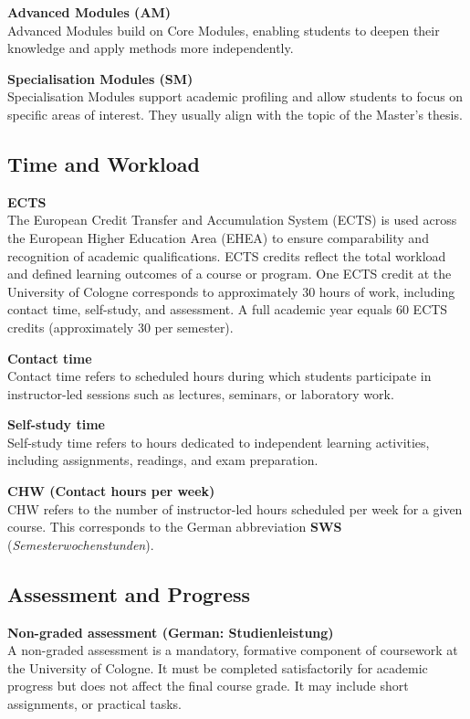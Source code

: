 \documentclass[
  letterpaper,
  10pt,
  openany]{book}
\begin{document}
\textbf{Advanced Modules (AM)}\\
Advanced Modules build on Core Modules, enabling students to deepen
their knowledge and apply methods more independently.

\textbf{Specialisation Modules (SM)}\\
Specialisation Modules support academic profiling and allow students to
focus on specific areas of interest. They usually align with the topic
of the Master's thesis.

\subsection*{Time and Workload}\label{time-and-workload}

\textbf{ECTS}\\
The European Credit Transfer and Accumulation System (ECTS) is used
across the European Higher Education Area (EHEA) to ensure comparability
and recognition of academic qualifications. ECTS credits reflect the
total workload and defined learning outcomes of a course or program. One
ECTS credit at the University of Cologne corresponds to approximately 30
hours of work, including contact time, self-study, and assessment. A
full academic year equals 60 ECTS credits (approximately 30 per
semester).

\textbf{Contact time}\\
Contact time refers to scheduled hours during which students participate
in instructor-led sessions such as lectures, seminars, or laboratory
work.

\textbf{Self-study time}\\
Self-study time refers to hours dedicated to independent learning
activities, including assignments, readings, and exam preparation.

\textbf{CHW (Contact hours per week)}\\
CHW refers to the number of instructor-led hours scheduled per week for
a given course. This corresponds to the German abbreviation \textbf{SWS}
(\emph{Semesterwochenstunden}).

\subsection*{Assessment and Progress}\label{assessment-and-progress}

\textbf{Non-graded assessment (German: Studienleistung)}\\
A non-graded assessment is a mandatory, formative component of
coursework at the University of Cologne. It must be completed
satisfactorily for academic progress but does not affect the final
course grade. It may include short assignments, or practical tasks.
\end{document}
